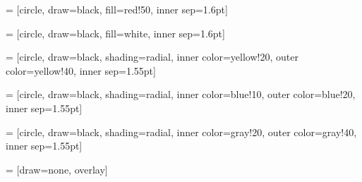  = [circle, draw=black, fill=red!50, inner sep=1.6pt]

 = [circle, draw=black, fill=white, inner sep=1.6pt]

 = [circle, draw=black, shading=radial, inner color=yellow!20, outer color=yellow!40, inner sep=1.55pt]

 = [circle, draw=black, shading=radial, inner color=blue!10, outer color=blue!20, inner sep=1.55pt]

 = [circle, draw=black, shading=radial, inner color=gray!20, outer color=gray!40, inner sep=1.55pt]

 = [draw=none, overlay]
